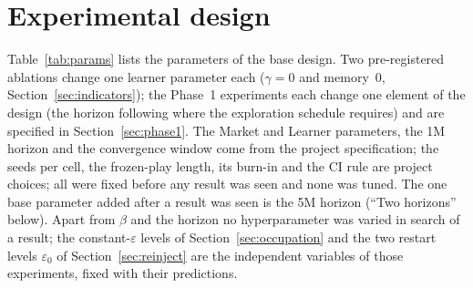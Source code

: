 \section{Experimental design}\label{sec:design}

Table~\ref{tab:params} lists the parameters of the base design. Two pre-registered ablations change one learner parameter each ($\gamma = 0$ and memory~0, Section~\ref{sec:indicators}); the Phase~1 experiments each change one element of the design (the horizon following where the exploration schedule requires) and are specified in Section~\ref{sec:phase1}. The Market and Learner parameters, the 1M horizon and the convergence window come from the project specification; the seeds per cell, the frozen-play length, its burn-in and the CI rule are project choices; all were fixed before any result was seen and none was tuned. The one base parameter added after a result was seen is the 5M horizon (``Two horizons'' below). Apart from $\beta$ and the horizon no hyperparameter was varied in search of a result; the constant-$\varepsilon$ levels of Section~\ref{sec:occupation} and the two restart levels $\varepsilon_0$ of Section~\ref{sec:reinject} are the independent variables of those experiments, fixed with their predictions.

